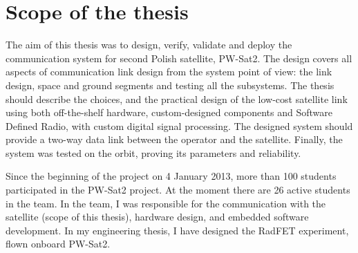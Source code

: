 \section{Scope of the thesis}
The aim of this thesis was to design, verify, validate and deploy the communication system for second Polish satellite, PW-Sat2. The design covers all aspects of communication link design from the system point of view: the link design, space and ground segments and testing all the subsystems. The thesis should describe the choices, and the practical design of the low-cost satellite link using both off-the-shelf hardware, custom-designed components and Software Defined Radio, with custom digital signal processing. The designed system should provide a two-way data link between the operator and the satellite. Finally, the system was tested on the orbit, proving its parameters and reliability.

Since the beginning of the project on 4 January 2013, more than 100 students participated in the PW-Sat2 project. At the moment there are 26 active students in the team. In the team, I was responsible for the communication with the satellite (scope of this thesis), hardware design, and embedded software development. In my engineering thesis, I have designed the RadFET experiment, flown onboard PW-Sat2.
